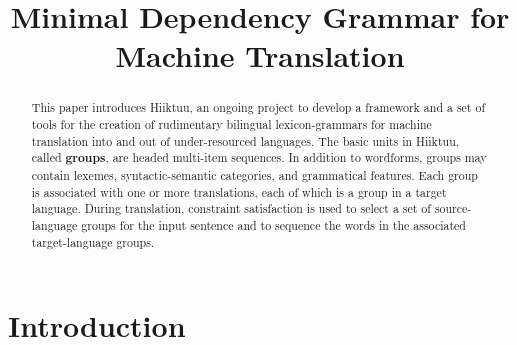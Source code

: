 \documentclass[11pt, a4paper]{article}
\title{Minimal Dependency Grammar for Machine Translation}
\author{
  }
\date{}
\begin{document}
\maketitle
\begin{abstract}
This paper introduces Hiiktuu,
an ongoing project to develop a framework and a set
of tools for the creation of rudimentary bilingual lexicon-grammars for machine translation
into and out of under-resourced languages.
The basic units in Hiiktuu, called \textbf{groups}, are headed multi-item sequences.
In addition to wordforms, groups may contain lexemes, syntactic-semantic categories,
and grammatical features.
Each group is associated with one or more translations, each of which is a group in a target
language.
During translation, constraint satisfaction is used to select a set of source-language groups
for the input sentence and to sequence the words in the associated target-language
groups.

\end{abstract}

\section{Introduction}
\label{intro}

%
% 
\end{document}

